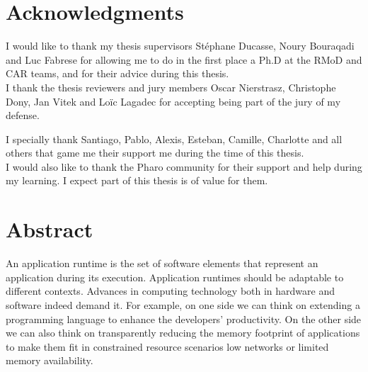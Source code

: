 \documentclass[a4paper,11pt,twoside]{include/ThesisStyle}
\begin{document}


\dominitoc

\cleardoublepage
\chapter*{Acknowledgments}

I would like to thank my thesis supervisors Stéphane Ducasse, Noury Bouraqadi and Luc Fabrese for allowing me to do in the first place a Ph.D at the RMoD and CAR teams, and for their advice during this thesis.\\

\noindent I thank the thesis reviewers and jury members Oscar Nierstrasz, Christophe Dony, Jan Vitek and Loïc Lagadec for accepting being part of the jury of my defense.%


\noindent I specially thank Santiago, Pablo, Alexis, Esteban, Camille, Charlotte and all others that game me their support me during the time of this thesis.\\

\noindent I would also like to thank the Pharo community for their support and help during my learning. I expect part of this thesis is of value for them.\\



\chapter*{Abstract}

An application runtime is the set of software elements that represent an application during its execution. Application runtimes should be adaptable to different contexts. Advances in computing technology both in hardware and software indeed demand it. For example, on one side we can think on extending a programming language to enhance the developers' productivity. On the other side we can also think on transparently reducing the memory footprint of applications to make them fit in constrained resource scenarios \eg low networks or limited memory availability.
\end{document}
